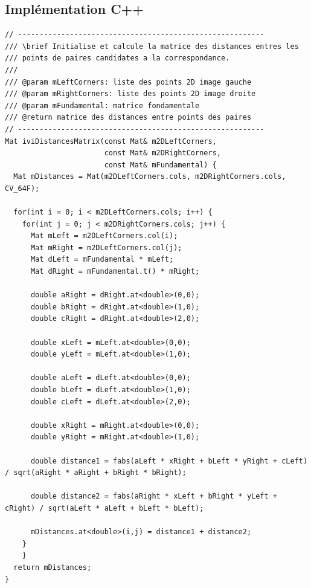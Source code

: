 \documentclass[a4paper]{article}
\begin{document}
\clearpage
\subsection{Implémentation C++}

\begin{lstlisting}
// ---------------------------------------------------------
/// \brief Initialise et calcule la matrice des distances entres les
/// points de paires candidates a la correspondance.
///
/// @param mLeftCorners: liste des points 2D image gauche
/// @param mRightCorners: liste des points 2D image droite
/// @param mFundamental: matrice fondamentale
/// @return matrice des distances entre points des paires
// ---------------------------------------------------------
Mat iviDistancesMatrix(const Mat& m2DLeftCorners,
                       const Mat& m2DRightCorners,
                       const Mat& mFundamental) {
  Mat mDistances = Mat(m2DLeftCorners.cols, m2DRightCorners.cols, CV_64F);

  for(int i = 0; i < m2DLeftCorners.cols; i++) {
    for(int j = 0; j < m2DRightCorners.cols; j++) {
      Mat mLeft = m2DLeftCorners.col(i);
      Mat mRight = m2DLeftCorners.col(j);
      Mat dLeft = mFundamental * mLeft;
      Mat dRight = mFundamental.t() * mRight;

      double aRight = dRight.at<double>(0,0);
      double bRight = dRight.at<double>(1,0);
      double cRight = dRight.at<double>(2,0);

      double xLeft = mLeft.at<double>(0,0);
      double yLeft = mLeft.at<double>(1,0);

      double aLeft = dLeft.at<double>(0,0);
      double bLeft = dLeft.at<double>(1,0);
      double cLeft = dLeft.at<double>(2,0);

      double xRight = mRight.at<double>(0,0);
      double yRight = mRight.at<double>(1,0);

      double distance1 = fabs(aLeft * xRight + bLeft * yRight + cLeft) / sqrt(aRight * aRight + bRight * bRight);

      double distance2 = fabs(aRight * xLeft + bRight * yLeft + cRight) / sqrt(aLeft * aLeft + bLeft * bLeft);

      mDistances.at<double>(i,j) = distance1 + distance2;
    }
    }
  return mDistances;
}
\end{lstlisting}

\clearpage
\end{document}

